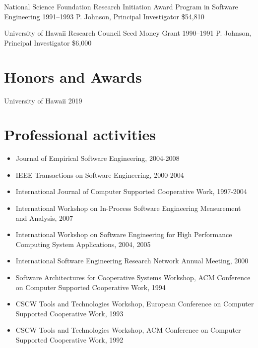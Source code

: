 \documentclass[11pt,letterpaper,sans]{moderncv} %
\begin{document}
        {National Science Foundation Research Initiation Award Program in Software Engineering} %
        {1991--1993} %
        {P. Johnson, Principal Investigator}  %
        {\$54,810} %

        {University of Hawaii Research Council Seed Money Grant} %
        {1990--1991} %
        {P. Johnson, Principal Investigator}  %
        {\$6,000} %

\section{Honors and Awards}

             {University of Hawaii}
             {2019} {} {}


\section{Professional activities}

\begin{itemize}
\item Journal of Empirical Software Engineering, 2004-2008
\item IEEE Transactions on Software Engineering, 2000-2004
\item International Journal of Computer Supported Cooperative Work, 1997-2004
\end{itemize}

\begin{itemize}
\item International Workshop on In-Process Software Engineering Measurement and Analysis, 2007
\item International Workshop on Software Engineering for High Performance Computing
  System Applications, 2004, 2005
\item International Software Engineering Research Network Annual Meeting, 2000
\item Software Architectures for Cooperative Systems Workshop, ACM Conference on
  Computer Supported Cooperative Work, 1994
\item CSCW Tools and Technologies Workshop, European Conference on Computer Supported
  Cooperative Work, 1993
\item CSCW Tools and Technologies Workshop, ACM Conference on Computer Supported Cooperative Work, 1992
\end{itemize}
\end{document}
